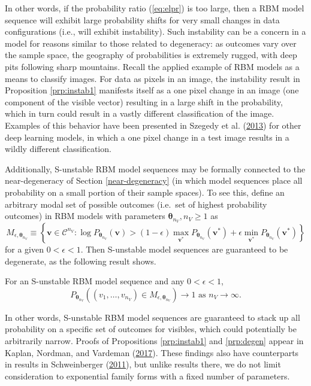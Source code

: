 \documentclass[12pt]{article}
\theoremstyle{definition}
\newcommand{\nv}{{n_{\scriptscriptstyle V}}}
\let\BeginKnitrBlock\begin \let\EndKnitrBlock\end
\begin{document}
In other words, if the probability ratio (\eqref{eq:elpr}) is too large,
then a RBM model sequence will exhibit large probability shifts for very
small changes in data configurations (i.e., will exhibit instability).
Such instability can be a concern in a model for reasons similar to
those related to degeneracy: as outcomes vary over the sample space, the
geography of probabilities is extremely rugged, with deep pits following
sharp mountains. Recall the applied example of RBM models as a means to
classify images. For data as pixels in an image, the instability result
in Proposition \ref{prp:instab1} manifests itself as a one pixel change
in an image (one component of the visible vector) resulting in a large
shift in the probability, which in turn could result in a vastly
different classification of the image. Examples of this behavior have
been presented in Szegedy et al.
(\protect\hyperlink{ref-szegedy2013intriguing}{2013}) for other deep
learning models, in which a one pixel change in a test image results in
a wildly different classification.

Additionally, S-unstable RBM model sequences may be formally connected
to the near-degeneracy of Section \ref{near-degeneracy} (in which model
sequences place all probability on a small portion of their sample
spaces). To see this, define an arbitrary modal set of possible outcomes
(i.e.~set of highest probability outcomes) in RBM models with parameters
\(\boldsymbol \theta_\nv, \nv \ge 1\) as \[
M_{\epsilon, \boldsymbol \theta_\nv} \equiv \left\{\boldsymbol v \in \mathcal{C}^\nv: \log P_{\boldsymbol \theta_\nv}(\boldsymbol v) > (1-\epsilon)\max\limits_{\boldsymbol v^*}P_{\boldsymbol \theta_\nv}(\boldsymbol v^*) + \epsilon\min\limits_{\boldsymbol v^*}P_{\boldsymbol \theta_\nv}(\boldsymbol v^*) \right\}
\] for a given \(0 < \epsilon < 1\). Then S-unstable model sequences are
guaranteed to be degenerate, as the following result shows.

\BeginKnitrBlock{proposition}
\protect\hypertarget{prp:degen}{}{\label{prp:degen}}For an S-unstable RBM
model sequence and any \(0 < \epsilon < 1\), \[
P_{\boldsymbol \theta_\nv}\left((v_1, \dots, v_\nv) \in M_{\epsilon, \boldsymbol \theta_\nv}\right) \rightarrow 1 \text{ as } \nv \rightarrow \infty.
\]
\EndKnitrBlock{proposition}

In other words, S-unstable RBM model sequences are guaranteed to stack
up all probability on a specific set of outcomes for visibles, which
could potentially be arbitrarily narrow. Proofs of Propositions
\ref{prp:instab1} and \ref{prp:degen} appear in Kaplan, Nordman, and
Vardeman (\protect\hyperlink{ref-kaplan2017note}{2017}). These findings
also have counterparts in results in Schweinberger
(\protect\hyperlink{ref-schweinberger2011instability}{2011}), but unlike
results there, we do not limit consideration to exponential family forms
with a fixed number of parameters.
\end{document}
